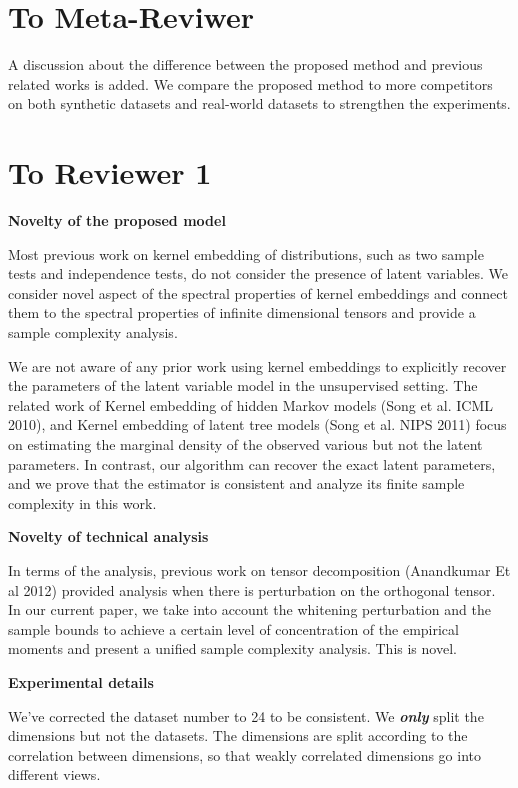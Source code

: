 \documentclass{article}
\begin{document}
\section*{To Meta-Reviwer}
A discussion about the difference between the proposed method and previous related works is added. We compare the proposed method to more competitors on both synthetic datasets and real-world datasets to strengthen the experiments.

\section*{To Reviewer 1}

\textbf{Novelty of the proposed model}

Most previous work on kernel embedding of distributions, such as two sample tests and independence tests, do not consider the presence of latent variables. We consider novel aspect of the spectral properties of kernel embeddings and connect them to the spectral properties of infinite dimensional tensors and provide a sample complexity analysis.

We are not aware of any prior work using kernel embeddings to explicitly recover the parameters of the latent variable model in the unsupervised setting. The related work of Kernel embedding of hidden Markov models (Song et al. ICML 2010), and Kernel embedding of latent tree models (Song et al. NIPS 2011) focus on estimating the marginal density of the observed various but not the latent parameters. In contrast, our algorithm can recover the exact latent parameters, and we prove that the estimator is consistent and analyze its finite sample complexity in this work.

\textbf{Novelty of technical analysis}

In terms of the analysis, previous work on tensor decomposition (Anandkumar Et al 2012) provided analysis when there is perturbation on the orthogonal tensor. In our current paper, we take into account the whitening perturbation and the sample bounds to achieve a certain level of concentration of the empirical moments and present a unified sample complexity analysis. This is novel.

\textbf{Experimental details}

We've corrected the dataset number to 24 to be consistent. We {\bf \emph{only}} split the dimensions but not the datasets. The dimensions are split according to the correlation between dimensions, so that weakly correlated dimensions go into different views.
\end{document}
